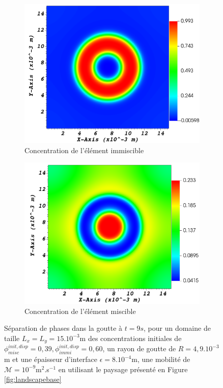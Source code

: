  \begin{figure}[H]
	\centering
	\begin{subfigure}[H]{0.4\textwidth}
		\centering
		\includegraphics[width=1\textwidth]{figure/separation_immi.png}
		\caption{Concentration de l'élément immiscible}
		\label{fig:y equals x}
	\end{subfigure} \hfil
	\begin{subfigure}[H]{0.4\textwidth}
		\centering
		\includegraphics[width=1\textwidth]{figure/separation_misc.png}
		\caption{Concentration de l'élément miscible}
		\label{fig:y equals x}
	\end{subfigure}
	\caption{Séparation de phases dans la goutte à $t=9s$, pour un domaine de taille $L_x = L_y = 15.10^{-3}$m des concentrations initiales de $\phi^{init,disp}_{misc} = 0,39,\phi^{init,disp}_{immi} = 0,60 $, un rayon de goutte de $R = 4,9.10^{-3}$m et une épaisseur d'interface $\epsilon = 8.10^{-4}$m, une mobilité de $\mathcal{M} = 10^{-9}$m$^2$.s$^{-1}$ en utilisant le paysage présenté en Figure \ref{fig:landscapebase}}
	\label{land_base_sep}
\end{figure} \vspace{-0.5cm}
